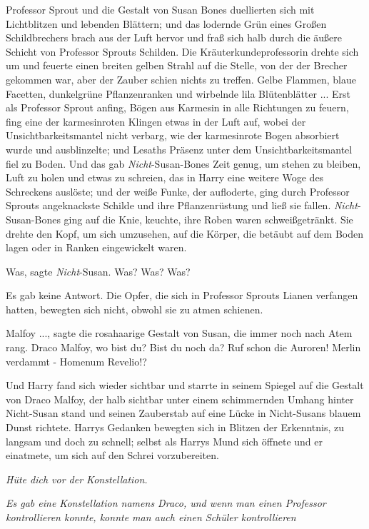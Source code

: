 Professor Sprout und die Gestalt von Susan Bones duellierten sich mit
Lichtblitzen und lebenden Blättern; und das lodernde Grün eines Großen
Schildbrechers brach aus der Luft hervor und fraß sich halb durch die äußere
Schicht von Professor Sprouts Schilden. Die Kräuterkundeprofessorin drehte sich
um und feuerte einen breiten gelben Strahl auf die Stelle, von der der Brecher
gekommen war, aber der Zauber schien nichts zu treffen. Gelbe Flammen, blaue
Facetten, dunkelgrüne Pflanzenranken und wirbelnde lila Blütenblätter ... Erst
als Professor Sprout anfing, Bögen aus Karmesin in alle Richtungen zu feuern,
fing eine der karmesinroten Klingen etwas in der Luft auf, wobei der
Unsichtbarkeitsmantel nicht verbarg, wie der karmesinrote Bogen absorbiert wurde
und ausblinzelte; und Lesaths Präsenz unter dem Unsichtbarkeitsmantel fiel zu
Boden. Und das gab \emph{Nicht}-Susan-Bones Zeit genug, um stehen zu bleiben,
Luft zu holen und etwas zu schreien, das in Harry eine weitere Woge des
Schreckens auslöste; und der weiße Funke, der aufloderte, ging durch Professor
Sprouts angeknackste Schilde und ihre Pflanzenrüstung und ließ sie fallen.
\emph{Nicht}-Susan-Bones ging auf die Knie, keuchte, ihre Roben waren
schweißgetränkt. Sie drehte den Kopf, um sich umzusehen, auf die Körper, die
betäubt auf dem Boden lagen oder in Ranken eingewickelt waren.

\glqq{}Was\grqq{}, sagte \emph{Nicht}-Susan. \glqq{}Was? Was? Was?\grqq{}

Es gab keine Antwort. Die Opfer, die sich in Professor Sprouts Lianen verfangen
hatten, bewegten sich nicht, obwohl sie zu atmen schienen.

\glqq{}Malfoy ...\grqq{}, sagte die rosahaarige Gestalt von Susan, die immer noch
nach Atem rang. \glqq{}Draco Malfoy, wo bist du? Bist du noch da? Ruf schon die
Auroren! Merlin verdammt - Homenum Revelio!?\grqq{}

Und Harry fand sich wieder sichtbar und starrte in seinem Spiegel auf die
Gestalt von Draco Malfoy, der halb sichtbar unter einem schimmernden Umhang
hinter Nicht-Susan stand und seinen Zauberstab auf eine Lücke in Nicht-Susans
blauem Dunst richtete. Harrys Gedanken bewegten sich in Blitzen der Erkenntnis,
zu langsam und doch zu schnell; selbst als Harrys Mund sich öffnete und er
einatmete, um sich auf den Schrei vorzubereiten.

\emph{Hüte dich vor der Konstellation.}

\emph{Es gab eine Konstellation namens Draco, und wenn man einen Professor
kontrollieren konnte, konnte man auch einen Schüler kontrollieren}

